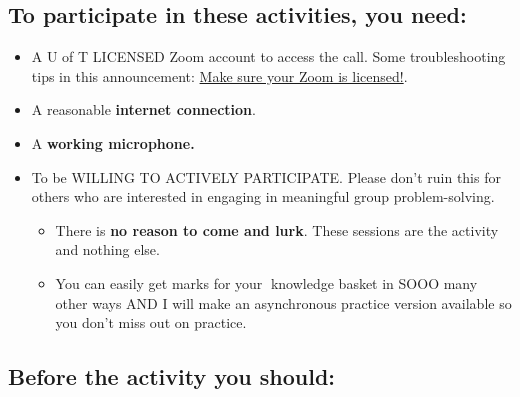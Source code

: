 \documentclass[
  openany]{book}
\begin{document}
\hypertarget{to-participate-in-these-activities-you-need}{%
\subsection{\texorpdfstring{To participate in these activities, you \textbf{need}:}{To participate in these activities, you need:}}\label{to-participate-in-these-activities-you-need}}

\begin{itemize}
\item
  A U of T LICENSED Zoom account to access the call. Some troubleshooting tips in this announcement: \href{https://q.utoronto.ca/courses/253305/discussion_topics/1565885}{Make sure your Zoom is licensed!}.
\item
  A reasonable \textbf{internet connection}.
\item
  A \textbf{working microphone.}
\item
  To be WILLING TO ACTIVELY PARTICIPATE. Please don't ruin this for others who are interested in engaging in meaningful group problem-solving.

  \begin{itemize}
  \item
    There is \textbf{no reason to come and lurk}. These sessions are the activity and nothing else.
  \item
    You can easily get marks for your 🧺knowledge basket in SOOO many other ways AND I will make an asynchronous practice version available so you don't miss out on practice.~
  \end{itemize}
\end{itemize}

\hypertarget{before-the-activity-you-should}{%
\subsection{\texorpdfstring{\textbf{Before} the activity you should:}{Before the activity you should:}}\label{before-the-activity-you-should}}
\end{document}
